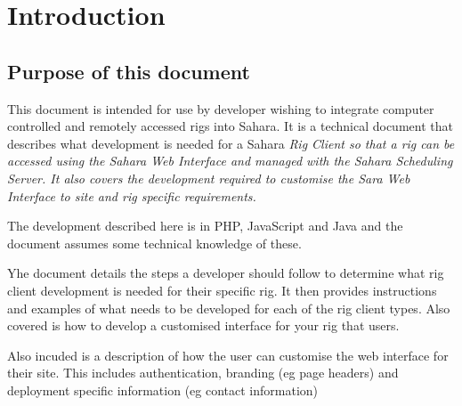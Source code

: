 \section{Introduction} 
\subsection{Purpose of this document}

This document is intended for use by developer wishing to integrate computer controlled and remotely accessed rigs into Sahara.  
It is a technical document that describes what development is needed for a Sahara \em{Rig Client} so that a rig can be accessed using the Sahara \em{Web Interface} and managed with the Sahara \em{Scheduling Server}.  It also covers the development required to customise the Sara Web Interface to site and rig specific requirements. 

The development described here is in PHP, JavaScript and Java and the document assumes some technical knowledge of these.

Yhe document details the steps a developer should follow to determine what rig client development is needed for their specific rig.  It then provides instructions and examples of what needs to be developed for each of the rig client types. Also covered is how to develop a customised interface for your rig that users.

Also incuded is a description of how the user can customise the web interface for their site.  This includes authentication, branding (eg page headers) and deployment specific information (eg contact information)


